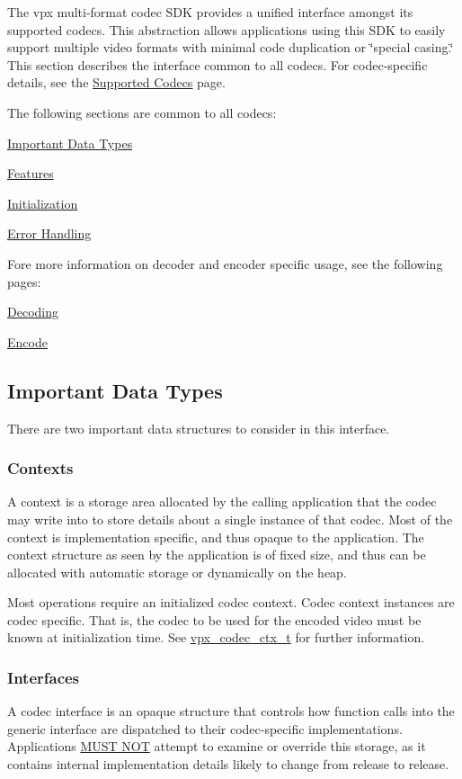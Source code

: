 \-The vpx multi-\/format codec \-S\-D\-K provides a unified interface amongst its supported codecs. \-This abstraction allows applications using this \-S\-D\-K to easily support multiple video formats with minimal code duplication or \char`\"{}special casing.\char`\"{} \-This section describes the interface common to all codecs. \-For codec-\/specific details, see the \hyperlink{group__codecs}{\-Supported \-Codecs} page.

\-The following sections are common to all codecs\-:
\begin{DoxyItemize}
\item \hyperlink{usage_usage_types}{\-Important \-Data \-Types}
\item \hyperlink{usage_usage_features}{\-Features}
\item \hyperlink{usage_usage_init}{\-Initialization}
\item \hyperlink{usage_usage_errors}{\-Error \-Handling}
\end{DoxyItemize}

\-Fore more information on decoder and encoder specific usage, see the following pages\-:
\begin{DoxyItemize}
\item \hyperlink{usage_decode}{\-Decoding}
\item \hyperlink{usage_encode}{\-Encode}
\end{DoxyItemize}\hypertarget{usage_usage_types}{}\subsection{\-Important Data Types}\label{usage_usage_types}
\-There are two important data structures to consider in this interface.\hypertarget{usage_usage_ctxs}{}\subsubsection{\-Contexts}\label{usage_usage_ctxs}
\-A context is a storage area allocated by the calling application that the codec may write into to store details about a single instance of that codec. \-Most of the context is implementation specific, and thus opaque to the application. \-The context structure as seen by the application is of fixed size, and thus can be allocated with automatic storage or dynamically on the heap.

\-Most operations require an initialized codec context. \-Codec context instances are codec specific. \-That is, the codec to be used for the encoded video must be known at initialization time. \-See \hyperlink{group__codec_gad03e2dfa6ae511db7d25be6bbb336233}{vpx\-\_\-codec\-\_\-ctx\-\_\-t} for further information.\hypertarget{usage_usage_ifaces}{}\subsubsection{\-Interfaces}\label{usage_usage_ifaces}
\-A codec interface is an opaque structure that controls how function calls into the generic interface are dispatched to their codec-\/specific implementations. \-Applications \hyperlink{rfc2119_MUSTNOT}{\-M\-U\-S\-T \-N\-O\-T} attempt to examine or override this storage, as it contains internal implementation details likely to change from release to release.

